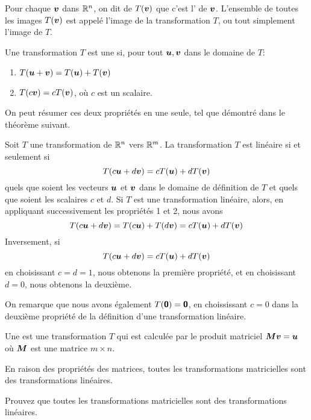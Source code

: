 Pour chaque $\boldsymbol{v}$ dans $\mathbb{R}^n$, on dit de $T(\boldsymbol{v})$ que c'est l' de $\boldsymbol{v}$. 
L'ensemble de toutes les images $T(\boldsymbol{v})$ est appelé l'image de la transformation $T$, ou tout simplement l'image de $T$.

\begin{defini}
Une transformation $T$ est une  si, pour
tout $\boldsymbol{u}, \boldsymbol{v}$ dans le domaine de $T$:
\begin{enumerate}
\item $T(\boldsymbol{u}+\boldsymbol{v}) = T(\boldsymbol{u}) + T(\boldsymbol{v})$
\item $T(c\boldsymbol{v}) = cT(\boldsymbol{v})$, où $c$ est un scalaire.
\end{enumerate}
\end{defini}

On peut résumer ces deux propriétés en une seule, tel que démontré dans le théorème suivant.
\pagebreak


\begin{theo}
Soit $T$  une transformation de $\mathbb{R}^n$ vers $\mathbb{R}^m$.  La transformation $T$
est linéaire si et seulement si
\[
T(c\boldsymbol{u} + d\boldsymbol{v}) = cT(\boldsymbol{u}) + dT(\boldsymbol{v})
\]
quels que soient les vecteurs $\boldsymbol{u}$ et $\boldsymbol{v}$ dans le domaine de définition
de $T$ et quels que soient les scalaires $c$ et $d$.
\proof
Si $T$ est une transformation linéaire, alors, en appliquant successivement les propriétés
1 et 2, nous avons
\[
T(c\boldsymbol{u} + d\boldsymbol{v}) = T(c\boldsymbol{u}) + T(d\boldsymbol{v}) = cT(\boldsymbol{u}) + dT(\boldsymbol{v})
\]
Inversement, si 
\[
T(c\boldsymbol{u} + d\boldsymbol{v}) = cT(\boldsymbol{u}) + dT(\boldsymbol{v})
\]
en choisissant $c=d=1$, nous obtenons la première propriété, et en choisissant $d=0$, nous
obtenons la deuxième.
\end{theo}
On remarque que nous avons également $T(\mbox{\textsf{\textbf{{0}}}}) = \mbox{\textsf{\textbf{{0}}}}$, en choississant $c=0$ dans la deuxième propriété
de la définition d'une transformation linéaire.


\begin{defini}
Une  est une transformation $T$ qui est calculée par
le produit matriciel
$
\boldsymbol{M}\boldsymbol{v} = \boldsymbol{u}
$
où $\boldsymbol{M}$ est une matrice $m\times n$.
\end{defini}

En raison des propriétés des matrices, toutes les transformations matricielles sont des transformations linéaires.
\begin{exerciceB}
Prouvez que toutes les transformations matricielles sont des transformations linéaires.
\end{exerciceB}

